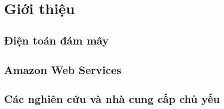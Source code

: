 \section{Giới thiệu}
\label{introduction}

\subsection{Điện toán đám mây}

\subsection{Amazon Web Services}

\subsection{Các nghiên cứu và nhà cung cấp chủ yếu}
